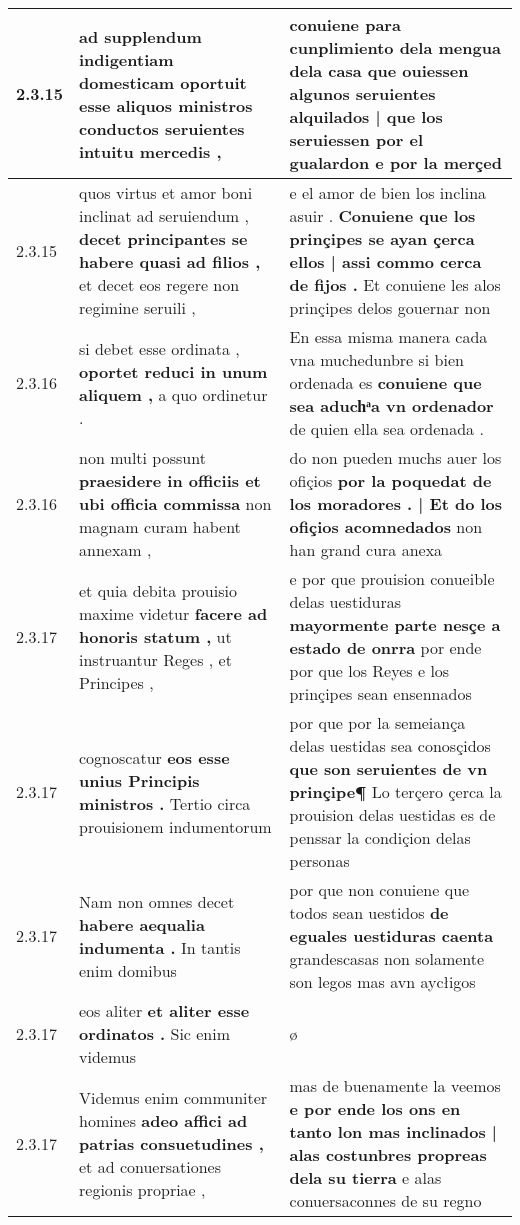 \begin{tabular}{|p{1cm}|p{6.5cm}|p{6.5cm}|}
2.3.15 & ad supplendum indigentiam domesticam oportuit \textbf{ esse aliquos ministros conductos seruientes } intuitu mercedis , & conuiene para cunplimiento dela mengua dela casa \textbf{ que ouiessen algunos seruientes alquilados | que los seruiessen por el gualardon } e por la merçed \\\hline
2.3.15 & quos virtus et amor boni inclinat ad seruiendum , \textbf{ decet principantes se habere quasi ad filios , } et decet eos regere non regimine seruili , & e el amor de bien los inclina asuir . \textbf{ Conuiene que los prinçipes se ayan çerca ellos | assi commo cerca de fijos . } Et conuiene les alos prinçipes delos gouernar non \\\hline
2.3.16 & si debet esse ordinata , \textbf{ oportet reduci in unum aliquem , } a quo ordinetur . & En essa misma manera cada vna muchedunbre si bien ordenada es \textbf{ conuiene que sea aduchͣa vn ordenador } de quien ella sea ordenada . \\\hline
2.3.16 & non multi possunt \textbf{ praesidere in officiis et ubi officia commissa } non magnam curam habent annexam , & do non pueden muchs auer los ofiçios \textbf{ por la poquedat de los moradores . | Et do los ofiçios acomnedados } non han grand cura anexa \\\hline
2.3.17 & et quia debita prouisio maxime videtur \textbf{ facere ad honoris statum , } ut instruantur Reges , et Principes , & e por que prouision conueible delas uestiduras \textbf{ mayormente parte nesçe a estado de onrra } por ende por que los Reyes e los prinçipes sean ensennados \\\hline
2.3.17 & cognoscatur \textbf{ eos esse unius Principis ministros . } Tertio circa prouisionem indumentorum & por que por la semeiança delas uestidas sea conosçidos \textbf{ que son seruientes de vn prinçipe¶ } Lo terçero çerca la prouision delas uestidas es de penssar la condiçion delas personas \\\hline
2.3.17 & Nam non omnes decet \textbf{ habere aequalia indumenta . } In tantis enim domibus & por que non conuiene que todos sean uestidos \textbf{ de eguales uestiduras caenta } grandescasas non solamente son legos mas avn aycłigos \\\hline
2.3.17 & eos aliter \textbf{ et aliter esse ordinatos . } Sic enim videmus & ø \\\hline
2.3.17 & Videmus enim communiter homines \textbf{ adeo affici ad patrias consuetudines , } et ad conuersationes regionis propriae , & mas de buenamente la veemos \textbf{ e por ende los ons en tanto lon mas inclinados | alas costunbres propreas dela su tierra } e alas conuersaconnes de su regno \\\hline

\end{tabular}
